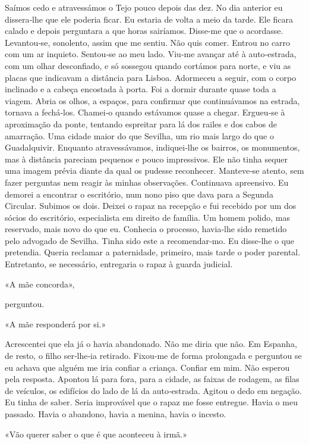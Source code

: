 Saímos cedo e atravessámos o Tejo pouco depois das dez. No dia anterior
eu dissera­‑lhe que ele poderia ficar. Eu estaria de volta a meio da
tarde. Ele ficara calado e depois perguntara a que horas sairíamos.
Disse­‑me que o acordasse. Levantou­‑se, sonolento, assim que me sentiu.
Não quis comer. Entrou no carro com um ar inquieto. Sentou­‑se ao meu
lado. Viu­‑me avançar até à auto­‑estrada, com um olhar desconfiado, e
só sossegou quando cortámos para norte, e viu as placas que indicavam a
distância para Lisboa. Adormeceu a seguir, com o corpo inclinado e a
cabeça encostada à porta. Foi a dormir durante quase toda a viagem.
Abria os olhos, a espaços, para confirmar que continuávamos na estrada,
tornava a fechá­‑los. Chamei­‑o quando estávamos quase a chegar.
Ergueu­‑se à aproximação da ponte, tentando espreitar para lá dos railes
e dos cabos de amarração. Uma cidade maior do que Sevilha, um rio mais
largo do que o Guadalquivir. Enquanto atravessávamos, indiquei­‑lhe os
bairros, os monumentos, mas à distância pareciam pequenos e pouco
impressivos. Ele não tinha sequer uma imagem prévia diante da qual os
pudesse reconhecer. Manteve­‑se atento, sem fazer perguntas nem reagir
às minhas observações. Continuava apreensivo. Eu demorei a encontrar o
escritório, num nono piso que dava para a Segunda Circular. Subimos os
dois. Deixei o rapaz na recepção e fui recebido por um dos sócios do
escritório, especialista em direito de família. Um homem polido, mas
reservado, mais novo do que eu. Conhecia o processo, havia­‑lhe sido
remetido pelo advogado de Sevilha. Tinha sido este a recomendar­‑mo. Eu
disse­‑lhe o que pretendia. Queria reclamar a paternidade, primeiro,
mais tarde o poder parental. Entretanto, se necessário, entregaria o
rapaz à guarda judicial.

«A mãe concorda»,

perguntou.

«A mãe responderá por si.»

Acrescentei que ela já o havia abandonado. Não me diria que não. Em
Espanha, de resto, o filho ser­‑lhe­‑ia retirado. Fixou­‑me de forma
prolongada e perguntou se eu achava que alguém me iria confiar a
criança. Confiar em mim. Não esperou pela resposta. Apontou lá para
fora, para a cidade, as faixas de rodagem, as filas de veículos, os
edifícios do lado de lá da auto­‑estrada. Agitou o dedo em negação. Eu
tinha de saber. Seria improvável que o rapaz me fosse entregue. Havia o
meu passado. Havia o abandono, havia a menina, havia o incesto.

«Vão querer saber o que é que aconteceu à irmã.»

